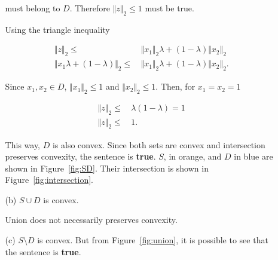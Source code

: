 \documentclass[11pt,a4paper]{article}
\begin{document}
\begin{itemize}
\begin{itemize}
        must belong to $D$. Therefore $\Vert z \Vert_2 \leq 1$ must be true.

        Using the triangle inequality

        \begin{equation*}
            \begin{aligned}
                \Vert z \Vert_2 \leq & \, \Vert x_1 \Vert_2 \lambda + (1 - \lambda)\Vert x_2 \Vert_2\\
                \Vert x_1\lambda + (1-\lambda)\Vert_2 \leq & \, \Vert x_1 \Vert_2 \lambda + (1-\lambda) \Vert x_2\Vert_2.
            \end{aligned}
        \end{equation*}

        Since $x_1, x_2 \in D$, $\Vert x_1 \Vert_2 \leq 1$ and $\Vert x_2 \Vert_2 \leq 1$. Then, for $x_1 = x_2 = 1$

        \begin{equation*}
            \begin{aligned}
                \Vert z \Vert_2 \leq \, & \lambda(1-\lambda) = 1\\
                \Vert z \Vert_2 \leq \, & 1.
            \end{aligned}
        \end{equation*}

        This way, $D$ is also convex. Since both sets are convex and intersection preserves convexity, the sentence is \textbf{true}. $S$, in orange, and $D$ in blue are shown in Figure~\ref{fig:SD}. Their intersection is shown in Figure~\ref{fig:intersection}.
 
        \item[(b)] $S \cup D$ is convex.
        
        Union does not necessarily preserves convexity. 
        \item[(c)] $S \setminus D$ is convex.  But from Figure~\ref{fig:union}, it is possible to see that the sentence is \textbf{true}.
        

\end{itemize}
\end{itemize}
\end{document}
